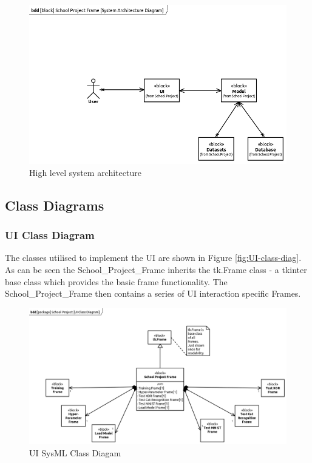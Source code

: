 \documentclass[./project-report/src/latex/project-report.tex]{subfiles}
\begin{document}
\begin{figure}[h!]
\centering
\includegraphics[width=1\textwidth]{./project-report/src/images/system-architecture-diagram.png}
\caption{High level system architecture}
\label{fig:system-architecture}
\end{figure}

\pagebreak

\subsection{Class Diagrams}

\subsubsection{UI Class Diagram}
\label{UI-class-diagram}
The classes utilised to implement the UI are shown in Figure \ref{fig:UI-class-diag}. As can be seen the School\_Project\_Frame inherits the tk.Frame class - a tkinter base 
class which provides 
the basic frame functionality. The School\_Project\_Frame then contains a series of UI interaction specific Frames.

\begin{figure}[h!]
\centering
\includegraphics[width=1\textwidth]{./project-report/src/images/ui-class-diagram.png}
\caption{UI SysML Class Diagam}
\label{fig:UI-class-diagram}
\end{figure}
\end{document}
